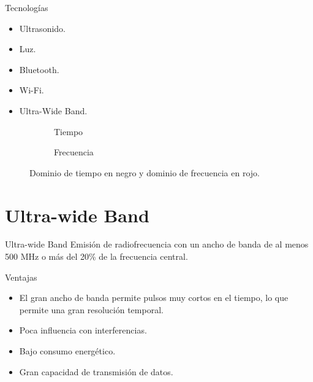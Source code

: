 \documentclass[xcolor=table]{beamer}
\begin{document}
  \begin{frame}{Tecnologías}
    \begin{itemize}
      \item Ultrasonido.
      \item Luz.
      \item Bluetooth.
      \item Wi-Fi.
      \item Ultra-Wide Band.
    \end{itemize}

    \begin{figure}[H]
      \begin{subfigure}[b]{.45\textwidth}
        \centering
        \def\svgwidth{0.7\linewidth}
         
        \caption{Tiempo}
        \label{fig:forma_pulsos_tiempo}
      \end{subfigure}
      \begin{subfigure}[b]{.45\textwidth}
        \centering
        \def\svgwidth{0.7\linewidth}
        
        \caption{Frecuencia}
        \label{fig:forma_pulsos_frec}
      \end{subfigure}
      \caption{Dominio de tiempo en negro y dominio de frecuencia en rojo.}
      \label{fig:forma_pulsos}
    \end{figure}
  \end{frame}

  \section{Ultra-wide Band}

  \begin{frame}{Ultra-wide Band}
    Emisión de radiofrecuencia con un ancho de banda de al menos 500 MHz o más del 20\% de la frecuencia central.
    
    \vspace{0.3cm}
    Ventajas
    \begin{itemize}
      \item El gran ancho de banda permite pulsos muy cortos en el tiempo, lo que permite una gran resolución temporal.
      \item Poca influencia con interferencias.
      \item Bajo consumo energético.
      \item Gran capacidad de transmisión de datos.
    \end{itemize}
  \end{frame}
\end{document}
